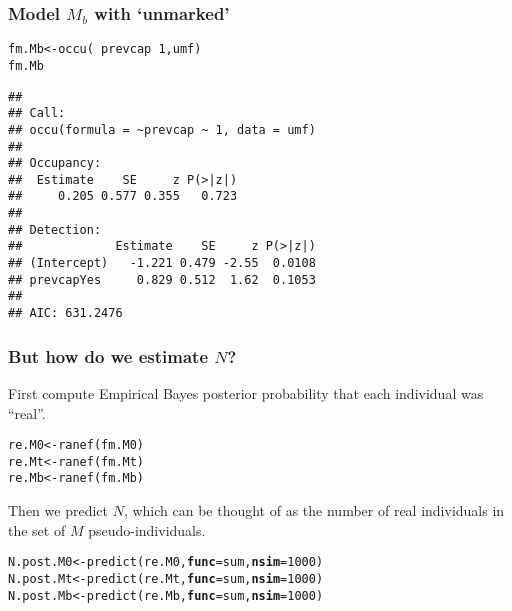 \documentclass[color=usenames,dvipsnames]{beamer}\usepackage[]{graphicx}\usepackage[]{color}
\makeatletter
\newcommand{\hlnum}[1]{\textcolor[rgb]{0.69,0.494,0}{#1}}%
\newcommand{\hlopt}[1]{\textcolor[rgb]{0,0,0}{#1}}%
\newcommand{\hlstd}[1]{\textcolor[rgb]{0,0,0}{#1}}%
\newcommand{\hlkwb}[1]{\textcolor[rgb]{0,0.341,0.682}{#1}}%
\newcommand{\hlkwc}[1]{\textcolor[rgb]{0,0,0}{\textbf{#1}}}%
\newcommand{\hlkwd}[1]{\textcolor[rgb]{0.004,0.004,0.506}{#1}}%
\newenvironment{kframe}{%
 \def\at@end@of@kframe{}%
 \ifinner\ifhmode%
  \def\at@end@of@kframe{\end{minipage}}%
  \begin{minipage}{\columnwidth}%
 \fi\fi%
 \def\FrameCommand##1{\hskip\@totalleftmargin \hskip-\fboxsep
 \colorbox{shadecolor}{##1}\hskip-\fboxsep
     \hskip-\linewidth \hskip-\@totalleftmargin \hskip\columnwidth}%
 \MakeFramed {\advance\hsize-\width
   \@totalleftmargin\z@ \linewidth\hsize
   \@setminipage}}%
 {\par\unskip\endMakeFramed%
 \at@end@of@kframe}
\newenvironment{knitrout}{}{} %
\makeatother
\begin{document}
\begin{frame}[fragile]
  \frametitle{Model $M_b$ with `unmarked'}
\begin{knitrout}\scriptsize
{}\color{fgcolor}\begin{kframe}
\begin{alltt}
\hlstd{fm.Mb} \hlkwb{<-} \hlkwd{occu}\hlstd{(}\hlopt{~}\hlstd{prevcap}\hlopt{~}\hlnum{1}\hlstd{, umf)}
\hlstd{fm.Mb}
\end{alltt}
\begin{verbatim}
## 
## Call:
## occu(formula = ~prevcap ~ 1, data = umf)
## 
## Occupancy:
##  Estimate    SE     z P(>|z|)
##     0.205 0.577 0.355   0.723
## 
## Detection:
##             Estimate    SE     z P(>|z|)
## (Intercept)   -1.221 0.479 -2.55  0.0108
## prevcapYes     0.829 0.512  1.62  0.1053
## 
## AIC: 631.2476
\end{verbatim}
\end{kframe}
\end{knitrout}
\end{frame}


\begin{frame}[fragile]
  \frametitle{But how do we estimate $N$?}
  First compute Empirical Bayes posterior probability that each
  individual was ``real''. 
\begin{knitrout}\footnotesize
{}\color{fgcolor}\begin{kframe}
\begin{alltt}
\hlstd{re.M0} \hlkwb{<-} \hlkwd{ranef}\hlstd{(fm.M0)}
\hlstd{re.Mt} \hlkwb{<-} \hlkwd{ranef}\hlstd{(fm.Mt)}
\hlstd{re.Mb} \hlkwb{<-} \hlkwd{ranef}\hlstd{(fm.Mb)}
\end{alltt}
\end{kframe}
\end{knitrout}
\pause
\vfill
Then we predict $N$, which can be thought of as the number of real
individuals in the set of $M$ pseudo-individuals.
\begin{knitrout}\footnotesize
{}\color{fgcolor}\begin{kframe}
\begin{alltt}
\hlstd{N.post.M0} \hlkwb{<-} \hlkwd{predict}\hlstd{(re.M0,} \hlkwc{func}\hlstd{=sum,} \hlkwc{nsim}\hlstd{=}\hlnum{1000}\hlstd{)}
\hlstd{N.post.Mt} \hlkwb{<-} \hlkwd{predict}\hlstd{(re.Mt,} \hlkwc{func}\hlstd{=sum,} \hlkwc{nsim}\hlstd{=}\hlnum{1000}\hlstd{)}
\hlstd{N.post.Mb} \hlkwb{<-} \hlkwd{predict}\hlstd{(re.Mb,} \hlkwc{func}\hlstd{=sum,} \hlkwc{nsim}\hlstd{=}\hlnum{1000}\hlstd{)}
\end{alltt}
\end{kframe}
\end{knitrout}
\end{frame}
\end{document}
